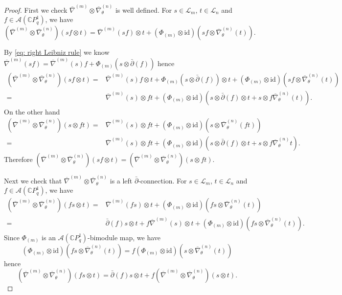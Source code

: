 \documentclass[12pt]{article}
\numberwithin{equation}{section}
\def\id{{\text{id}}}
\def\pb{\bar{\partial}}
\def\nb{\bar{\nabla}_\theta}
\def\nb{\overline{\nabla}_\theta}
\def\C{{\mathbb C}}
\def\A{\mathcal{A}}
\def\L{\mathcal{L}}
\begin{document}
\begin{proof}
    First we check $\overline{\nabla}^{(m)}\otimes \nb^{(n)}$ is well defined. For $s\in \L_m$, $t\in \L_n$ and $f\in \A(\C P^1_q)$, we have 
    $$
    (\overline{\nabla}^{(m)}\otimes \nb^{(n)})(sf\otimes t)=\overline{\nabla}^{(m)}(sf)\otimes t+(\Phi_{(m)}\otimes \id) (sf \otimes \nb^{(n)}(t)).
    $$

    By \eqref{eq: right Leibniz rule} we know 
    $\overline{\nabla}^{(m)}(sf)=\overline{\nabla}^{(m)}(s)f+\Phi_{(m)}(s\otimes \pb(f))$
    hence
      \begin{equation*}
      \begin{split}
    (\overline{\nabla}^{(m)}\otimes \nb^{(n)})(sf\otimes t)=&\overline{\nabla}^{(m)}(s)f\otimes t+\Phi_{(m)}(s\otimes \pb(f))\otimes t+(\Phi_{(m)}\otimes \id) (sf \otimes \nb^{(n)}(t))\\
    =&\overline{\nabla}^{(m)}(s)\otimes ft+(\Phi_{(m)}\otimes \id) (s\otimes \pb(f)\otimes t+s \otimes f\nb^{(n)}(t)).
    \end{split}
    \end{equation*}
    On the other hand
      \begin{equation*}
      \begin{split}
    (\overline{\nabla}^{(m)}\otimes \nb^{(n)})(s\otimes ft)=&\overline{\nabla}^{(m)}(s)\otimes ft+ (\Phi_{(m)}\otimes \id)(s\otimes \nb^{(n)}(ft))\\
    =&\overline{\nabla}^{(m)}(s)\otimes ft+(\Phi_{(m)}\otimes \id)(s\otimes \pb(f)\otimes t+s\otimes f\nb^{(n)}t).
     \end{split}
    \end{equation*}
Therefore $(\overline{\nabla}^{(m)}\otimes \nb^{(n)})(sf\otimes t)=(\overline{\nabla}^{(m)}\otimes \nb^{(n)})(s\otimes ft)$.

Next we check that $\overline{\nabla}^{(m)}\otimes \nb^{(n)}$ is a left $\pb$-connection. For $s\in \L_m$, $t\in \L_n$ and $f\in \A(\C P^1_q)$, we have
  \begin{equation*}
      \begin{split}
    (\overline{\nabla}^{(m)}\otimes \nb^{(n)})(fs\otimes t)=&\overline{\nabla}^{(m)}(fs)\otimes t+(\Phi_{(m)}\otimes \id) (fs \otimes \nb^{(n)}(t))\\
    =& \pb(f)s\otimes t+f\overline{\nabla}^{(m)}(s)\otimes t+(\Phi_{(m)}\otimes \id) (fs \otimes \nb^{(n)}(t)).
     \end{split}
         \end{equation*}
     Since $\Phi_{(m)}$ is an $\A(\C P^1_q)$-bimodule map, we have
     $$(\Phi_{(m)}\otimes \id) (fs \otimes \nb^{(n)}(t))=f(\Phi_{(m)}\otimes \id) (s \otimes \nb^{(n)}(t))$$ hence
$$(\overline{\nabla}^{(m)}\otimes \nb^{(n)})(fs\otimes t)=\pb(f)s\otimes t+f(\overline{\nabla}^{(m)}\otimes \nb^{(n)})(s\otimes t).$$


\end{proof}
\end{document}
